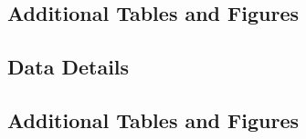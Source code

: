 \documentclass[12pt]{article}
\begin{document}
\subsection{Additional Tables and Figures}

\subsection{Data Details}

\subsection{Additional Tables and Figures}
\end{document}
